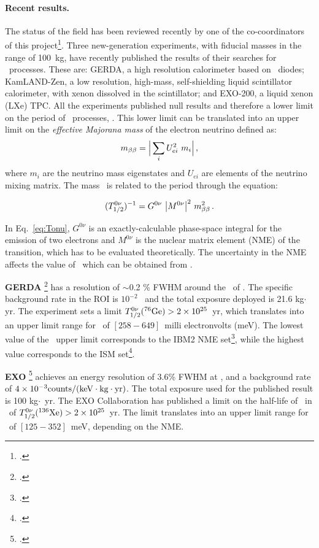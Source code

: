  \paragraph{Recent results.}
 The status of the field has been reviewed recently by one of the co-coordinators of this project\footcite{INSS2014}. Three new-generation experiments, with fiducial masses in the range of 100~kg, have recently published the results of their searches for \bbonu\ processes. These are: GERDA, a high resolution calorimeter based on \GE\ diodes; KamLAND-Zen, a low resolution, high-mass, self-shielding liquid scintillator calorimeter, with xenon dissolved in the scintillator; and EXO-200, a liquid xenon (LXe) TPC. All the experiments published null results and therefore a lower limit on the period of \bbonu\ processes, \Tonu. This lower limit can be translated into an upper limit on the \emph{effective Majorana mass} of the electron neutrino defined as:
\begin{equation}
m_{\beta\beta} = \Big| \sum_{i} U^{2}_{ei} \ m_{i} \Big| \, ,
\end{equation}
%
where $m_{i}$ are the neutrino mass eigenstates and $U_{ei}$ are elements of the neutrino mixing matrix. The mass \mbb\ is related to the period through the equation:

\begin{equation}
(T^{0\nu}_{1/2})^{-1} = G^{0\nu} \ \big|M^{0\nu}\big|^{2} \ \mbb^{2} \, .
\label{eq:Tonu}
\end{equation}

In Eq.~\ref{eq:Tonu}, $G^{0\nu}$ is an exactly-calculable phase-space integral for the emission of two electrons and $M^{0\nu}$ is the nuclear matrix element (NME) of the transition, which has to be evaluated theoretically. The uncertainty in the NME affects the value of \mbb\ which can be obtained from \Tonu.
 
{\bf GERDA} \footcite{Agostini:2013mzu} has a resolution of $\sim$0.2 \% FWHM around the \Qbb\ of \GE. The specific background rate in the ROI is $10^{-2}$ \ckky\ and the total exposure deployed is 21.6 kg$\cdot$yr. The experiment sets a limit $T_{1/2}^{0\nu}({}^{76}\rm Ge)> 2 \times 10^{25}$~yr, which translates into an upper limit range for \mbb\ of $[258-649]$~milli electronvolts (meV). The lowest value of the \mbb\ upper limit corresponds to the IBM2 NME set\footcite{Barea:2013bz}, while the highest value corresponds to the ISM set\footcite{Menendez:2008jp}.

{\bf EXO} \footcite{Albert:2014awa} achieves an energy resolution of 3.6\% FWHM at \Qbb, and a background rate of $ 4 \times 10^{-3}\rm counts/(keV \cdot kg \cdot yr)$. The total exposure used for the published result is 100 kg$\cdot$~yr. The EXO Collaboration has published a limit on the half-life of \bbonu\ in \XE\ of $T_{1/2}^{0\nu}({}^{136}\rm Xe) > 2 \times 10^{25}$~yr. The limit translates into an upper limit range for \mbb\ of $[125-352]$~meV, depending on the NME.

